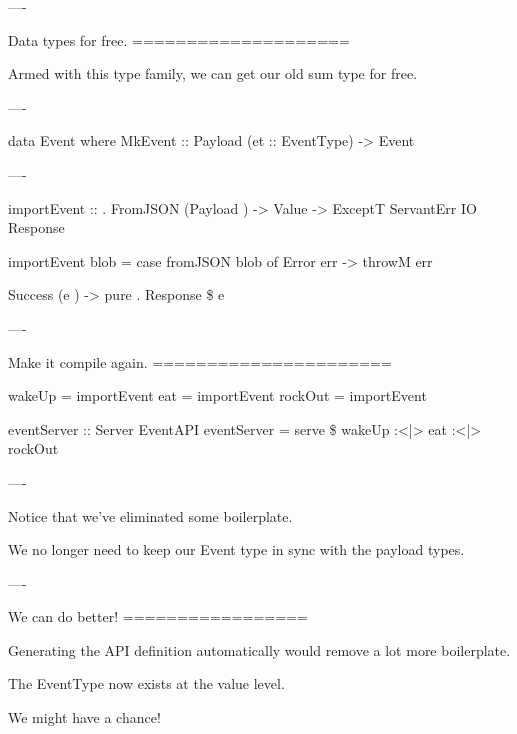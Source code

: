 ----

Data types for free.
====================

Armed with this type family, we can get our old sum type for free.

----

\begin{hs}

  data Event where
    MkEvent :: Payload (et :: EventType) -> Event
\end{hs}

----

\begin{raw}

  importEvent :: 
               . FromJSON (Payload )
              -> Value
              -> ExceptT ServantErr IO Response

  importEvent blob =
    case fromJSON blob of
      Error err ->
        throwM err

      Success (e ) ->
        pure . Response \$  e
\end{raw}

----

Make it compile again.
======================

\begin{raw}

  wakeUp  = importEvent 
  eat     = importEvent 
  rockOut = importEvent 

  eventServer :: Server EventAPI
  eventServer = serve \$
    wakeUp :<|> eat :<|> rockOut
\end{raw}

----

Notice that we've eliminated some boilerplate.

We no longer need to keep our Event type in sync with the payload types.

----

We can do better!
=================

Generating the API definition automatically would remove a lot more boilerplate.

The EventType now exists at the value level.

We might have a chance!

